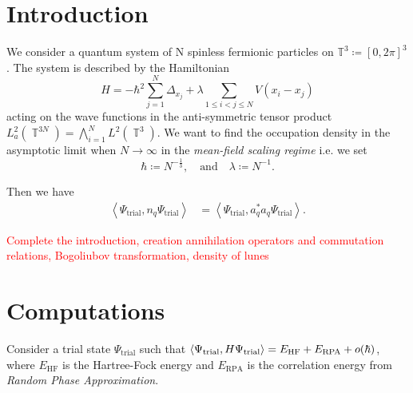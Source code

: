 \documentclass[sn-mathphys, Numbered ,a4paper]{sn-jnl}%
\DeclareMathOperator{\T}{\mathbb{T}}
\newcommand{\eva}[1]{\left\langle #1 \right\rangle}
\theoremstyle{plain}
\theoremstyle{definition}
\theoremstyle{remark}
\theoremstyle{plain}
\theoremstyle{definition}
\theoremstyle{remark}
\begin{document}
\section{Introduction}\label{sec1}
We consider a quantum system of N spinless fermionic particles on $\mathbb{T}^3\coloneq [0,2\pi]^3$. The system is described by the Hamiltonian
\begin{equation}
    H = -\hbar^2\sum\limits_{j=1}^{N}\Delta_{x_j} + \lambda\!\!\!\sum\limits_{1\leq i < j \leq N } V(x_i - x_j)
\end{equation}
acting on the wave functions in the anti-symmetric tensor product $L^2_a(\T^{3N}) = \bigwedge_{i=1}^N L^2(\T^3)$.
We want to find the occupation density in the asymptotic limit when $N\rightarrow\infty$ in the \textit{mean-field scaling regime} i.e. we set
\begin{equation}
    \hbar\coloneq N^{-\frac{1}{3}}, \quad\text{and}\quad \lambda \coloneq N^{-1}.
\end{equation}



Then we have
\begin{align}
    \eva{\Psi_{\text{trial}},n_q\Psi_{\text{trial}}} &= \eva{\Psi_{\text{trial}},a^*_qa_q\Psi_{\text{trial}}} .
\end{align}

\textcolor{red}{Complete the introduction, creation annihilation operators and commutation relations, Bogoliubov transformation, density of lunes}


\section{Computations}\label{sec2}

Consider a trial state $\Psi_{\mathrm{trial}}$ such that $\braket{\Psi_{\mathrm{trial}},H\Psi_{\mathrm{trial}}} = E_{\mathrm{HF}} + E_{\mathrm{RPA}}+ o(\hbar) $, where $E_{\mathrm{HF}}$ is the Hartree-Fock energy and $E_{\mathrm{RPA}}$ is the correlation energy from \textit{Random Phase Approximation}.
\end{document}
